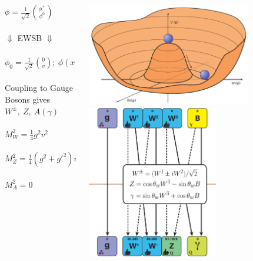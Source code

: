 \documentclass{beamer}
\newcommand*{\header}[1]{\fontsize{16}{8}\selectfont \textbf{{\color{MyPurple}{#1}}}}
\begin{document}
\begin{frame}
\begin{center}
\header{Higgs Mechanism}
\end{center}
\begin{columns}
\begin{column}{0.5\textwidth}
\color{MyPurple}{Scalar Boson}\color{black}
\begin{center}
$\phi = \frac{1}{\sqrt{2}}\binom{\phi^+}{\phi^0}$\\~\\
\huge$\Downarrow$ \normalsize EWSB \huge$\Downarrow$ \normalsize\\~\\
$\phi_0 = \frac{1}{\sqrt{2}}\binom{0}{v};\ \phi(x) = \frac{1}{\sqrt{2}}\binom{0}{v + h(x)}$\\~\\
Coupling to Gauge Bosons gives $W^{\pm},\ Z,\ A(\gamma)$\\~\\
$M_W^2 = \frac{1}{4}g^2v^2$\\~\\
\vspace{-0.3cm}$M_Z^2 = \frac{1}{4}(g^2 + g'^{2})v^2$\\~\\
\vspace{-0.3cm}$M_A^2 = 0$
\end{center}
\end{column}
\begin{column}{0.5\textwidth}
\begin{center}
\includegraphics[width=0.75\textwidth]{figures/higgspotential}\\
\includegraphics[width=0.6\textwidth]{figures/Higgs_mech}

\end{center}
\end{column}
\end{columns}
\end{frame}
\end{document}

